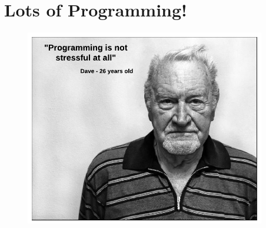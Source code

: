\documentclass[usenames,11,dvipsnames,svgnames,x11names,aspectratio=1610,bibref]{beamer}
\newcommand{\mydisclaimer}{{\color{disclaimer}{\footnotesize Lecture 1~}}}
\renewcommand\sec{{\cnordSix{\secname}\hfill\mydisclaimer} }
\begin{document}
\section{Lots of Programming!}
\begin{frame}[fragile]{\sec}
\vspace*{\fill}
\begin{center} 
\begin{figure}
    \centering
    \includegraphics[width=10.5cm]{figures/lecture2/meme.pdf}
\end{figure}
    \end{center}
\vspace*{\fill}
\end{frame}


\end{document}
